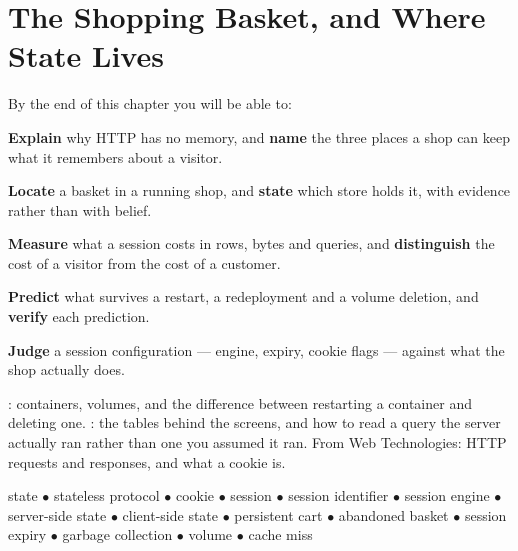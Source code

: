 \chapter{The Shopping Basket, and Where State Lives}\label{ch:basket}

\begin{outcomes}
By the end of this chapter you will be able to:
\begin{tight}
  \item \textbf{Explain} why HTTP has no memory, and \textbf{name} the three
        places a shop can keep what it remembers about a visitor.
  \item \textbf{Locate} a basket in a running shop, and \textbf{state} which
        store holds it, with evidence rather than with belief.
  \item \textbf{Measure} what a session costs in rows, bytes and queries, and
        \textbf{distinguish} the cost of a visitor from the cost of a customer.
  \item \textbf{Predict} what survives a restart, a redeployment and a volume
        deletion, and \textbf{verify} each prediction.
  \item \textbf{Judge} a session configuration --- engine, expiry, cookie
        flags --- against what the shop actually does.
\end{tight}
\end{outcomes}

\begin{prereq}
: containers, volumes, and the difference between restarting a
container and deleting one. : the tables behind the screens,
and how to read a query the server actually ran rather than one you assumed it
ran. From Web Technologies: HTTP requests and responses, and what a cookie is.
\end{prereq}

\begin{keyterms}
state $\bullet$ stateless protocol $\bullet$ cookie $\bullet$ session
$\bullet$ session identifier $\bullet$ session engine $\bullet$ server-side
state $\bullet$ client-side state $\bullet$ persistent cart $\bullet$
abandoned basket $\bullet$ session expiry $\bullet$ garbage collection
$\bullet$ volume $\bullet$ cache miss
\end{keyterms}

